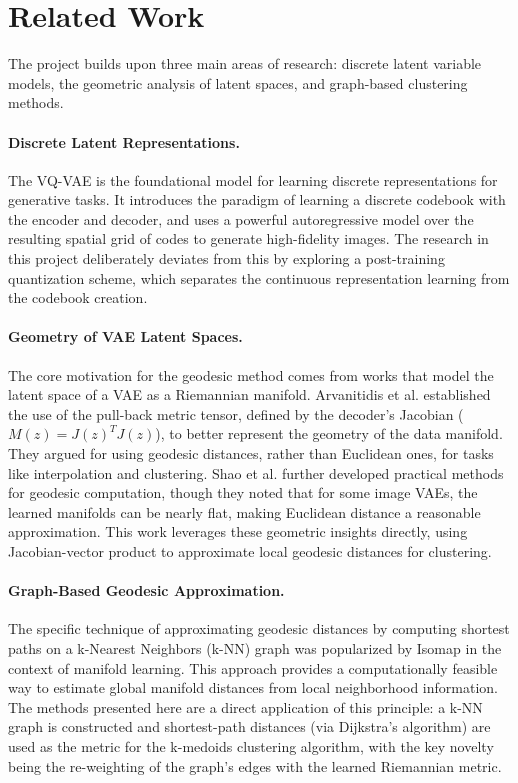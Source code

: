 \documentclass{article}
\begin{document}
\section{Related Work}
The project builds upon three main areas of research: discrete latent variable models, the geometric analysis of latent spaces, and graph-based clustering methods.

\paragraph{Discrete Latent Representations.} The VQ-VAE \cite{van2017neural} is the foundational model for learning discrete representations for generative tasks. 
It introduces the paradigm of learning a discrete codebook with the encoder and decoder, and uses a powerful autoregressive model over the resulting spatial grid of codes to generate high-fidelity images. 
The research in this project deliberately deviates from this by exploring a post-training quantization scheme, which separates the continuous representation learning from the codebook creation.

\paragraph{Geometry of VAE Latent Spaces.} The core motivation for the geodesic method comes from works that model the latent space of a VAE as a Riemannian manifold. Arvanitidis et al. \cite{arvanitidis2017latent} established the use of the pull-back metric tensor, defined by the decoder's Jacobian ($M(z) = J(z)^T J(z)$), to better represent the geometry of the data manifold. They argued for using geodesic distances, rather than Euclidean ones, for tasks like interpolation and clustering. Shao et al. \cite{shao2018riemannian} further developed practical methods for geodesic computation, though they noted that for some image VAEs, the learned manifolds can be nearly flat, making Euclidean distance a reasonable approximation. 
This work leverages these geometric insights directly, using Jacobian-vector product to approximate local geodesic distances for clustering.

\paragraph{Graph-Based Geodesic Approximation.} The specific technique of approximating geodesic distances by computing shortest paths on a k-Nearest Neighbors (k-NN) graph was popularized by Isomap \cite{tenenbaum2000global} in the context of manifold learning. This approach provides a computationally feasible way to estimate global manifold distances from local neighborhood information. The methods presented here are a direct application of this principle: a k-NN graph is constructed and shortest-path distances (via Dijkstra's algorithm) are used as the metric for the k-medoids clustering algorithm, with the key novelty being the re-weighting of the graph's edges with the learned Riemannian metric.
\end{document}
